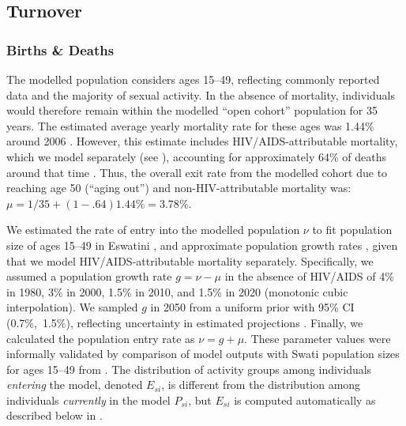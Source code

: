 \subsection{Turnover}\label{mod.par.turn}
\subsubsection{Births \& Deaths}\label{mod.par.turn.bd}
The modelled population considers ages 15--49,
reflecting commonly reported data and the majority of sexual activity.
In the absence of mortality, individuals would therefore
remain within the modelled ``open cohort'' population for 35 years.
The estimated average yearly mortality rate for these ages was 1.44\% around 2006
\cite[Table~15.2]{SDHS2006}.
However, this estimate includes HIV/AIDS-attributable mortality,
which we model separately (see ),
accounting for approximately 64\% of deaths around that time \cite{WHO2006esw}.
Thus, the overall exit rate from the modelled cohort
due to reaching age 50 (``aging out'') and non-HIV-attributable mortality was:
$\mu = 1/35 + (1-.64) 1.44\% = 3.78\%$.
\par
We estimated the rate of entry into the modelled population $\nu$
to fit population size of ages 15--49 in Eswatini \cite{WorldBank},
and approximate population growth rates \cite{UNWPP2019},
given that we model HIV/AIDS-attributable mortality separately.
Specifically, we assumed a population growth rate $g = \nu - \mu$ in the absence of HIV/AIDS of
4\% in 1980, 3\% in 2000, 1.5\% in 2010, and 1.5\% in 2020 (monotonic cubic interpolation).
We sampled $g$ in 2050 from a uniform prior with 95\% CI (0.7\%,~1.5\%),
reflecting uncertainty in estimated projections \cite{UNWPP2019}.
Finally, we calculated the population entry rate as $\nu = g + \mu$.
These parameter values were informally validated by comparison of model outputs with
Swati population sizes for ages 15--49 from \cite{WorldBank}.
The distribution of activity groups among individuals \emph{entering} the model, denoted $E_{si}$,
is different from the distribution among individuals \emph{currently} in the model $P_{si}$,
but $E_{si}$ is computed automatically as described below in .
